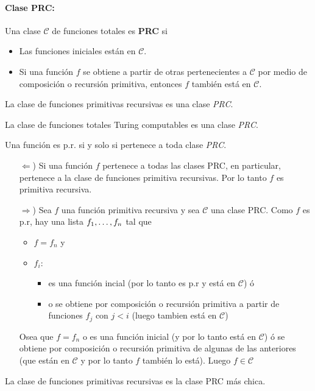 	\paragraph{Clase PRC:}	Una clase $\mathcal{C}$ de funciones totales es \textbf{PRC} si
	\begin{itemize}
		\item Las funciones iniciales están en $\mathcal{C}$.
		\item Si una función $f$ se obtiene a partir de otras pertenecientes a $\mathcal{C}$ por medio de composición o recursión primitiva, entonces $f$ también está en $\mathcal{C}$.
	\end{itemize}

	\begin{corolario}
La clase de funciones primitivas recursivas es una clase \textit{PRC}.
	\end{corolario}
	
	\begin{teorema}
La clase de funciones totales Turing computables es una clase \textit{PRC}.
	\end{teorema}
	\newtheorem{prEsPrSiiEstaEnC}{Teorema}[section]
	\begin{teorema}
Una función es p.r. si y solo si pertenece a toda clase \textit{PRC}.
	\end{teorema}
	
	\begin{demo}
		\begin{itemize}
			\item[$\Leftarrow$)] Si una función $f$ pertenece a todas las clases PRC, en particular, pertenece a la clase de funciones primitiva recursivas. Por lo tanto $f$ es primitiva recursiva.
			\item[$\Rightarrow$)] Sea $f$ una función primitiva recursiva y sea $\mathcal{C}$ una clase PRC. Como $f$ es p.r, hay una lista $f_1,\dots, f_{n}$
			tal que
			\begin{itemize}
				\item $f = f_n$ y
				\item $f_i$:
				\begin{itemize}
				\item es una función incial (por lo tanto es p.r y está en $\mathcal{C}$) ó
				\item o se obtiene por composición o recursión primitiva a partir de funciones $f_j$ con $j < i$ (luego tambien está en $\mathcal{C}$)
				\end{itemize}
			\end{itemize}
			Osea que $f=f_n$ o es una función inicial (y por lo tanto está en $\mathcal{C}$) ó se obtiene por composición o recursión primitiva de algunas de las anteriores (que están en $\mathcal{C}$ y por lo tanto $f$ también lo está). Luego $f\in\mathcal{C}$
		\end{itemize}
	\end{demo}
	\begin{corolario}
La clase de funciones primitivas recursivas es la clase PRC más chica.
	\end{corolario}
	
